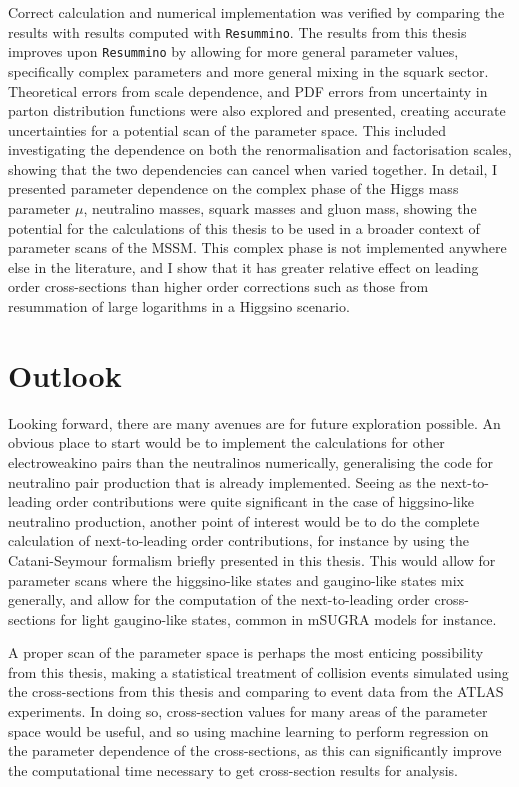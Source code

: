 Correct calculation and numerical implementation was verified by comparing the results with results computed with \verb|Resummino|.
The results from this thesis improves upon \verb|Resummino| by allowing for more general parameter values, specifically complex parameters and more general mixing in the squark sector.
Theoretical errors from scale dependence, and PDF errors from uncertainty in parton distribution functions were also explored and presented, creating accurate uncertainties for a potential scan of the parameter space.
This included investigating the dependence on both the renormalisation and factorisation scales, showing that the two dependencies can cancel when varied together.
In detail, I presented parameter dependence on the complex phase of the Higgs mass parameter \(\mu\), neutralino masses, squark masses and gluon mass, showing the potential for the calculations of this thesis to be used in a broader context of parameter scans of the MSSM\@.
This complex phase is not implemented anywhere else in the literature, and I show that it has greater relative effect on leading order cross-sections than higher order corrections such as those from resummation of large logarithms in a Higgsino scenario.


\section*{Outlook}
Looking forward, there are many avenues are for future exploration possible.
An obvious place to start would be to implement the calculations for other electroweakino pairs than the neutralinos numerically, generalising the code for neutralino pair production that is already implemented.
Seeing as the next-to-leading order contributions were quite significant in the case of higgsino-like neutralino production, another point of interest would be to do the complete calculation of next-to-leading order contributions, for instance by using the Catani-Seymour formalism briefly presented in this thesis.
This would allow for parameter scans where the higgsino-like states and gaugino-like states mix generally, and allow for the computation of the next-to-leading order cross-sections for light gaugino-like states, common in mSUGRA models for instance.
\medskip

A proper scan of the parameter space is perhaps the most enticing possibility from this thesis, making a statistical treatment of collision events simulated using the cross-sections from this thesis and comparing to event data from the ATLAS experiments.
In doing so, cross-section values for many areas of the parameter space would be useful, and so using machine learning to perform regression on the parameter dependence of the cross-sections, as this can significantly improve the computational time necessary to get cross-section results for analysis.

